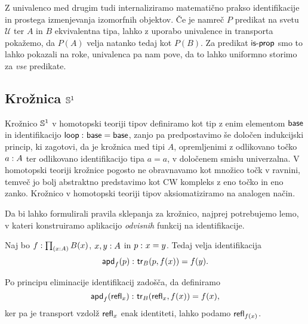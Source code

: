 Z univalenco med drugim tudi internaliziramo matematično prakso identifikacije in prostega izmenjevanja izomorfnih objektov. Če je namreč \(P\) predikat na svetu \(\mathcal{U}\) ter \(A\) in \(B\) ekvivalentna tipa, lahko z uporabo univalence in transporta pokažemo, da \(P(A)\) velja natanko tedaj kot \(P(B)\). Za predikat \(\textnormal{\textsf{is-prop}}\) smo to lahko pokazali na roke, univalenca pa nam pove, da to lahko uniformno storimo za \emph{vse} predikate.

\subsection{Krožnica \(\mathbb{S}^{1}\)}

Krožnico \(\mathbb{S}^{1}\) v homotopski teoriji tipov definiramo kot tip z enim elementom \(\textnormal{\textsf{base}}\) in identifikacijo \(\textnormal{\textsf{loop}} \,\colon \textnormal{\textsf{base}} = \textnormal{\textsf{base}}\), zanjo pa predpostavimo še določen indukcijski princip, ki zagotovi, da je krožnica med tipi \(A\), opremljenimi z odlikovano točko \(a : A\) ter odlikovano identifikacijo tipa \(a = a\), v določenem smislu univerzalna. V homotopski teoriji krožnice pogosto ne obravnavamo kot množico točk v ravnini, temveč jo bolj abstraktno predstavimo kot CW kompleks z eno točko in eno zanko. Krožnico v homotopski teoriji tipov aksiomatiziramo na analogen način.

Da bi lahko formulirali pravila sklepanja za krožnico, najprej potrebujemo lemo, v kateri konstruiramo aplikacijo \emph{odvisnih} funkcij na identifikacije.

\begin{lema}
  Naj bo \(f : \textstyle \prod_{\left( x : A \right)} B(x)\), \(x, y : A\) in \(p \,\colon x = y\). Tedaj velja identifikacija
  \[\textnormal{\textsf{apd}}_{f}(p) \,\colon \textnormal{\textsf{tr}}_{B}(p, f(x)) = f(y).\]
\end{lema}

\begin{dokaz}
  Po principu eliminacije identifikacij zadošča, da definiramo \[\textnormal{\textsf{apd}}_{f}(\textnormal{\textsf{refl}}_{x}) \,\colon \textnormal{\textsf{tr}}_{B}(\textnormal{\textsf{refl}}_{x}, f(x)) = f(x),\] ker pa je transport vzdolž \(\textnormal{\textsf{refl}}_{x}\) enak identiteti, lahko podamo \(\textnormal{\textsf{refl}}_{f(x)}\).
\end{dokaz}



